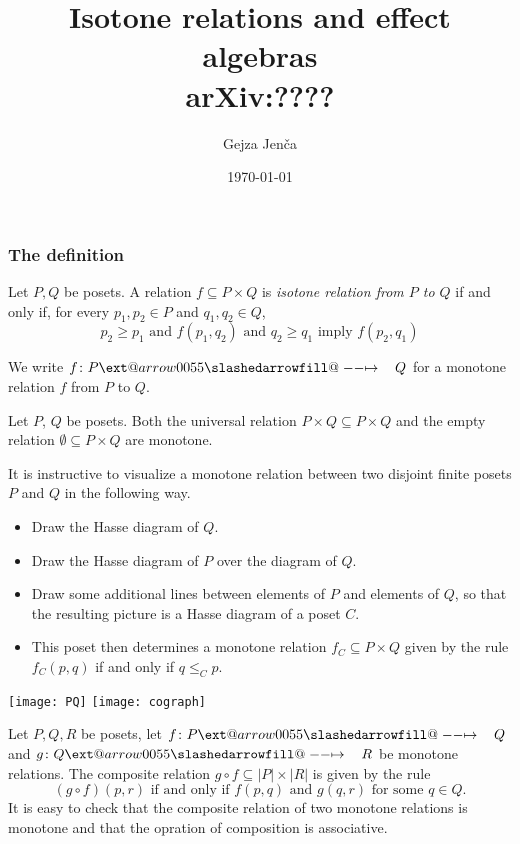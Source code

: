 \documentclass{beamer}
\title[Isotone relations and EAs]{Isotone relations and effect algebras\\
\small{arXiv:????}}
\author{Gejza Jenča}
\institute[]{Slovak University of Technology Bratislava}
\date{\today}
\makeatletter
\def\slashedarrowfill@#1#2#3#4#5{%
  $\m@th\thickmuskip0mu\medmuskip\thickmuskip\thinmuskip\thickmuskip
  \relax#5#1\mkern-7mu%
  \cleaders\hbox{$#5\mkern-2mu#2\mkern-2mu$}\hfill
  \mathclap{#3}\mathclap{#2}%
  \cleaders\hbox{$#5\mkern-2mu#2\mkern-2mu$}\hfill
  \mkern-7mu#4$%
}
\def\rightslashedarrowfill@{%
  \slashedarrowfill@\relbar\relbar\mapstochar\rightarrow}
\newcommand\xslashedrightarrow[2][]{%
  \ext@arrow 0055{\rightslashedarrowfill@}{#1}{#2}}
\newcommand{\sto}{\xslashedrightarrow{\hskip 1pc}}
\makeatother
\begin{document}
\begin{frame}
\maketitle
\end{frame}
\begin{frame}
\frametitle{The definition}
\begin{definition}
Let $P,Q$ be posets. A relation $f\subseteq P\times Q$ is {\em isotone relation
from $P$ to $Q$}
if and only if, for every $p_1,p_2\in P$ and $q_1,q_2\in Q$,
$$
p_2\geq p_1\text{ and } f(p_1,q_2)\text{ and }q_2\geq q_1\text{ imply } f(p_2,q_1)
$$
\end{definition}
We write $f\colon P\sto Q$ for a monotone relation $f$ from $P$ to $Q$.
\begin{example}
Let $P$, $Q$ be posets. Both the universal 
relation $P\times Q\subseteq P\times Q$ and the empty relation $\emptyset\subseteq P\times
Q$ are monotone.
\end{example}
\end{frame}

\begin{frame}
It is instructive to visualize a monotone relation between two disjoint finite
posets $P$ and $Q$ in the following way.
\begin{itemize}
\item Draw the Hasse diagram of $Q$.
\item Draw the Hasse diagram of $P$ over the diagram of $Q$.
\item Draw some additional lines between elements of $P$ and elements of $Q$,
so that the resulting picture is a Hasse diagram of a poset $C$.
\item This poset then determines a monotone relation $f_C\subseteq P\times Q$ 
given by the rule $f_C(p,q)$ if and only if $q\leq_C p$.
\end{itemize}
\end{frame}
\begin{frame}
\begin{center}
\texttt{[image: PQ]}
\texttt{[image: cograph]}
\end{center}
\end{frame}
\begin{frame}
Let $P,Q,R$ be posets, let $f\colon P\sto Q$ and $g\colon Q\sto R$ be
monotone relations. The composite relation $g\circ f\subseteq|P|\times|R|$ is given
by the rule
$$
(g\circ f)(p,r)\text{ if and only if }
	f(p,q)\text{ and }g(q,r)\text{ for some }q\in Q.
$$
It is easy to check that the composite relation of two monotone relations is
monotone and that the opration of composition is associative.
\end{frame}
\end{document}

